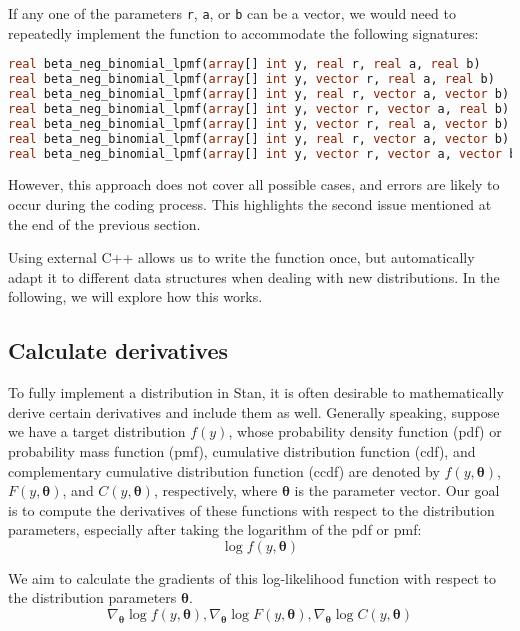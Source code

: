 \documentclass[11pt]{article}
\begin{document}
If any one of the parameters \verb|r|, \verb|a|, or \verb|b| can be a vector, we would need to repeatedly implement the function to accommodate the following signatures:
\begin{lstlisting}[language=Stan, style=lgeneral]
real beta_neg_binomial_lpmf(array[] int y, real r, real a, real b)
real beta_neg_binomial_lpmf(array[] int y, vector r, real a, real b)
real beta_neg_binomial_lpmf(array[] int y, real r, vector a, vector b)
real beta_neg_binomial_lpmf(array[] int y, vector r, vector a, real b)
real beta_neg_binomial_lpmf(array[] int y, vector r, real a, vector b)
real beta_neg_binomial_lpmf(array[] int y, real r, vector a, vector b)
real beta_neg_binomial_lpmf(array[] int y, vector r, vector a, vector b)
\end{lstlisting}
However, this approach does not cover all possible cases, and errors are likely to occur during the coding process. This highlights the second issue mentioned at the end of the previous section.

Using external C++ allows us to write the function once, but automatically adapt it to different data structures when dealing with new distributions. In the following, we will explore how this works.



\subsection{Calculate derivatives}

To fully implement a distribution in Stan, it is often desirable to mathematically derive certain derivatives and include them as well. Generally speaking, suppose we have a target distribution \( f(y) \), whose probability density function (pdf) or probability mass function (pmf), cumulative distribution function (cdf), and complementary cumulative distribution function (ccdf) are denoted by \( f(y, \boldsymbol\theta) \), \( F(y, \boldsymbol\theta) \), and \( C(y, \boldsymbol\theta) \), respectively, where \( \boldsymbol\theta \) is the parameter vector. Our goal is to compute the derivatives of these functions with respect to the distribution parameters, especially after taking the logarithm of the pdf or pmf: 
\begin{equation}
\log f(y, \boldsymbol\theta)
\end{equation}


We aim to calculate the gradients of this log-likelihood function with respect to the distribution parameters \( \boldsymbol\theta \).
\begin{equation}
\nabla_{\boldsymbol{\theta}} \log f(y,\boldsymbol\theta), \nabla_{\boldsymbol{\theta}}\log F(y,\boldsymbol\theta), \nabla_{\boldsymbol {\theta}}\log C(y,\boldsymbol\theta)
\end{equation}
\end{document}

